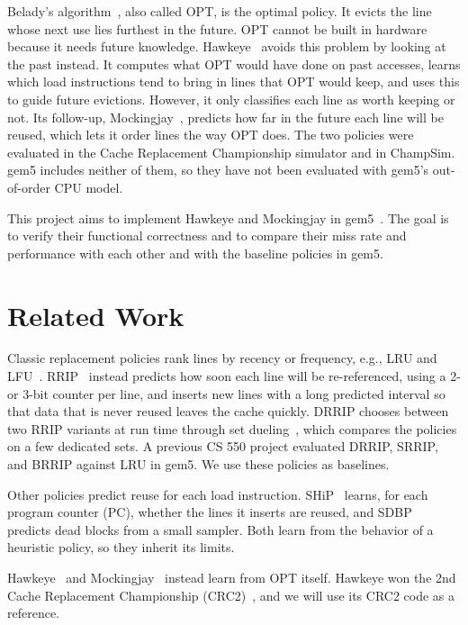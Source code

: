 \documentclass[lettersize,journal]{IEEEtran}
\begin{document}
Belady's algorithm~\cite{belady}, also called OPT, is the optimal policy. It
evicts the line whose next use lies furthest in the future. OPT cannot be built
in hardware because it needs future knowledge. Hawkeye~\cite{hawkeye} avoids
this problem by looking at the past instead. It computes what OPT would have
done on past accesses, learns which load instructions tend to bring in lines
that OPT would keep, and uses this to guide future evictions. However, it only
classifies each line as worth keeping or not. Its follow-up,
Mockingjay~\cite{mockingjay}, predicts how far in the future each line will be
reused, which lets it order lines the way OPT does. The two policies were
evaluated in the Cache Replacement Championship simulator and in ChampSim. gem5
includes neither of them, so they have not been evaluated with gem5's
out-of-order CPU model.

This project aims to implement Hawkeye and Mockingjay in
gem5~\cite{gem5,gem5v20}. The goal is to verify their functional correctness
and to compare their miss rate and performance with each other and with the
baseline policies in gem5.

\section{Related Work}

Classic replacement policies rank lines by recency or frequency, e.g., LRU and
LFU~\cite{hp6}. RRIP~\cite{rrip} instead predicts how soon each line will be
re-referenced, using a 2- or 3-bit counter per line, and inserts new lines with
a long predicted interval so that data that is never reused leaves the cache
quickly. DRRIP chooses between two RRIP variants at run time through set
dueling~\cite{dip}, which compares the policies on a few dedicated sets. A
previous CS 550 project evaluated DRRIP, SRRIP, and BRRIP against LRU in gem5.
We use these policies as baselines.

Other policies predict reuse for each load instruction. SHiP~\cite{ship} learns,
for each program counter (PC), whether the lines it inserts are reused, and
SDBP~\cite{sdbp} predicts dead blocks from a small sampler. Both learn from the
behavior of a heuristic policy, so they inherit its limits.

Hawkeye~\cite{hawkeye} and Mockingjay~\cite{mockingjay} instead learn from OPT
itself. Hawkeye won the 2nd Cache Replacement Championship (CRC2)~\cite{crc2},
and we will use its CRC2 code as a reference.
\end{document}

